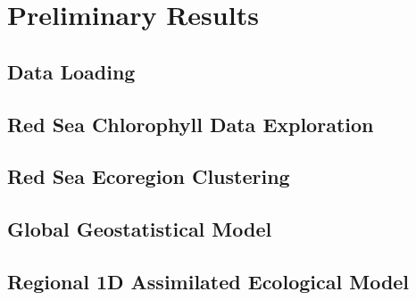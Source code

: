 \chapter{Preliminary Results}

\section{Data Loading}

\section{Red Sea Chlorophyll Data Exploration}

\section{Red Sea Ecoregion Clustering}

\section{Global Geostatistical Model}

\section{Regional 1D Assimilated Ecological Model}

